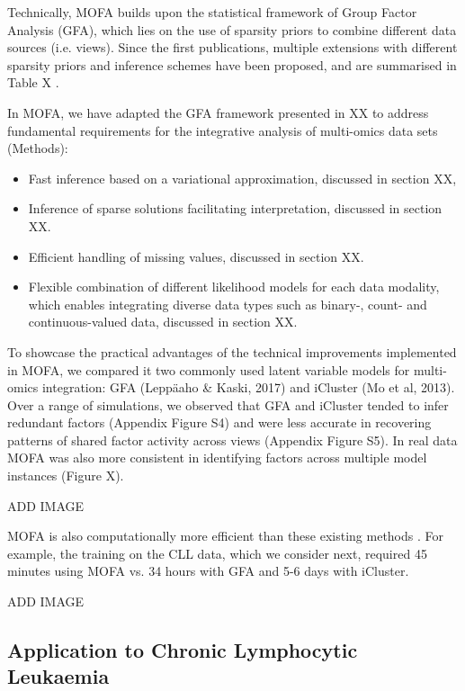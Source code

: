 Technically, MOFA builds upon the statistical framework of Group Factor Analysis (GFA), which lies on the use of sparsity priors to combine different data sources (i.e. views). Since the first publications, multiple extensions with different sparsity priors and inference schemes have been proposed, and are summarised in Table X \cite{(Bunte et al, 2016; Khan et al, 2014; Klami et al, 2015; Leppäaho & Kaski, 2017; Virtanen et al, 2012; Zhao et al, 2016)}.

In MOFA, we have adapted the GFA framework presented in XX to address fundamental requirements for the integrative analysis of multi-omics data sets (Methods): 
\begin{itemize}
	\item Fast inference based on a variational approximation, discussed in section XX,
	\item Inference of sparse solutions facilitating interpretation, discussed in section XX.
	\item Efficient handling of missing values, discussed in section XX.
	\item Flexible combination of different likelihood models for each data modality, which enables integrating diverse data types such as binary-, count- and continuous-valued data, discussed in section XX.
\end{itemize}

To showcase the practical advantages of the technical improvements implemented in MOFA, we compared it two commonly used latent variable models for multi-omics integration: GFA (Leppäaho & Kaski, 2017) and iCluster (Mo et al, 2013).\\
Over a range of simulations, we observed that GFA and iCluster tended to infer redundant factors (Appendix Figure S4) and were less accurate in recovering patterns of shared factor activity across views (Appendix Figure S5). In real data MOFA was also more consistent in identifying factors across multiple model instances (Figure X).

ADD IMAGE


MOFA is also computationally more efficient than these existing methods . For example, the training on the CLL data, which we consider next, required 45 minutes using MOFA vs. 34 hours with GFA and 5-6 days with iCluster. 

ADD IMAGE

\subsection{Application to Chronic Lymphocytic Leukaemia}

